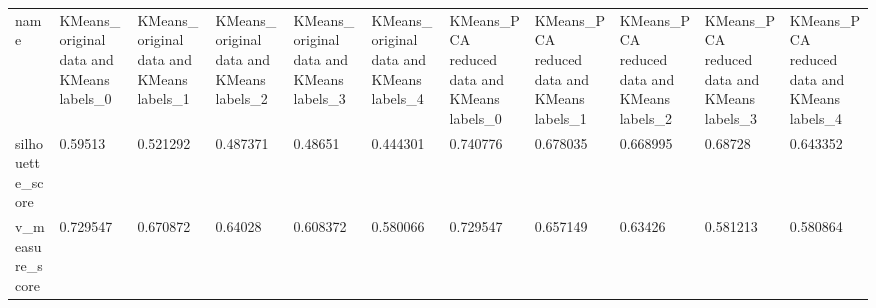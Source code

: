 \begin{tabular}{lllllllllll}
name                  &           KMeans\_original data and KMeans labels\_0 &           KMeans\_original data and KMeans labels\_1 &           KMeans\_original data and KMeans labels\_2 &           KMeans\_original data and KMeans labels\_3 &           KMeans\_original data and KMeans labels\_4 &        KMeans\_PCA reduced data and KMeans labels\_0 &        KMeans\_PCA reduced data and KMeans labels\_1 &        KMeans\_PCA reduced data and KMeans labels\_2 &        KMeans\_PCA reduced data and KMeans labels\_3 &        KMeans\_PCA reduced data and KMeans labels\_4 \\
silhouette\_score      &                                            0.59513 &                                           0.521292 &                                           0.487371 &                                            0.48651 &                                           0.444301 &                                           0.740776 &                                           0.678035 &                                           0.668995 &                                            0.68728 &                                           0.643352 \\
v\_measure\_score       &                                           0.729547 &                                           0.670872 &                                            0.64028 &                                           0.608372 &                                           0.580066 &                                           0.729547 &                                           0.657149 &                                            0.63426 &                                           0.581213 &                                           0.580864 \\
\bottomrule
\end{tabular}

